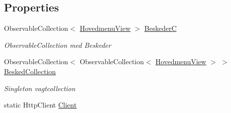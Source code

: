 \subsection*{Properties}
\begin{DoxyCompactItemize}
\item 
Observable\+Collection$<$ \hyperlink{class__1aarsproeve_1_1_model_1_1_hovedmenu_view}{Hovedmenu\+View} $>$ \hyperlink{class__1aarsproeve_1_1_view_model_1_1_hoved_view_model_a75cca0494e9b39bb827eb182f927cea5}{Beskeder\+C}
\begin{DoxyCompactList}\small\item\em Observable\+Collection med Beskeder \end{DoxyCompactList}\item 
Observable\+Collection$<$ Observable\+Collection$<$ \hyperlink{class__1aarsproeve_1_1_model_1_1_hovedmenu_view}{Hovedmenu\+View} $>$ $>$ \hyperlink{class__1aarsproeve_1_1_view_model_1_1_hoved_view_model_ac123bfcd71b56f5aba5a60f18d42f5b6}{Besked\+Collection}
\begin{DoxyCompactList}\small\item\em Singleton vagtcollection \end{DoxyCompactList}\item 
\hypertarget{class__1aarsproeve_1_1_view_model_1_1_hoved_view_model_a199de2473d17139ea8423ba05fba12e8}{}static Http\+Client \hyperlink{class__1aarsproeve_1_1_view_model_1_1_hoved_view_model_a199de2473d17139ea8423ba05fba12e8}{Client}\label{class__1aarsproeve_1_1_view_model_1_1_hoved_view_model_a199de2473d17139ea8423ba05fba12e8}


\end{DoxyCompactItemize}

